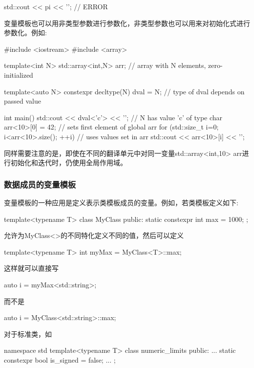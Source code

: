 \begin{cpp}
std::cout << pi << '\n'; // ERROR
\end{cpp}

变量模板也可以用非类型参数进行参数化，非类型参数也可以用来对初始化式进行参数化。例如:

\begin{cpp}
#include <iostream>
#include <array>

template<int N>
std::array<int,N> arr{}; // array with N elements, zero-initialized

template<auto N>
	constexpr decltype(N) dval = N; // type of dval depends on passed value

int main()
{
	std::cout << dval<'c'> << '\n'; // N has value 'c' of type char
	arr<10>[0] = 42; // sets first element of global arr
	for (std::size_t i=0; i<arr<10>.size(); ++i) { // uses values set in arr
		std::cout << arr<10>[i] << '\n';
	}
}
\end{cpp}

同样需要注意的是，即使在不同的翻译单元中对同一变量std::array<int,10> arr进行初始化和迭代时，仍使用全局作用域。

\subsubsection{数据成员的变量模板}

变量模板的一种应用是定义表示类模板成员的变量。例如，若类模板定义如下:

\begin{cpp}
template<typename T>
class MyClass {
	public:
	static constexpr int max = 1000;
};
\end{cpp}

允许为MyClass<>的不同特化定义不同的值，然后可以定义

\begin{cpp}
template<typename T>
int myMax = MyClass<T>::max;
\end{cpp}

这样就可以直接写

\begin{cpp}
auto i = myMax<std::string>;
\end{cpp}

而不是

\begin{cpp}
auto i = MyClass<std::string>::max;
\end{cpp}

对于标准类，如

\begin{cpp}
namespace std {
	template<typename T> class numeric_limits {
		public:
		...
		static constexpr bool is_signed = false;
		...
	};
}
\end{cpp}

